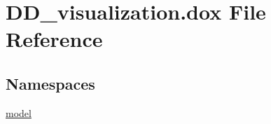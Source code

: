 \hypertarget{_d_d__visualization_8dox}{}\section{D\+D\+\_\+visualization.\+dox File Reference}
\label{_d_d__visualization_8dox}
\subsection*{Namespaces}
\begin{DoxyCompactItemize}
\item 
 \hyperlink{namespacemodel}{model}
\end{DoxyCompactItemize}
